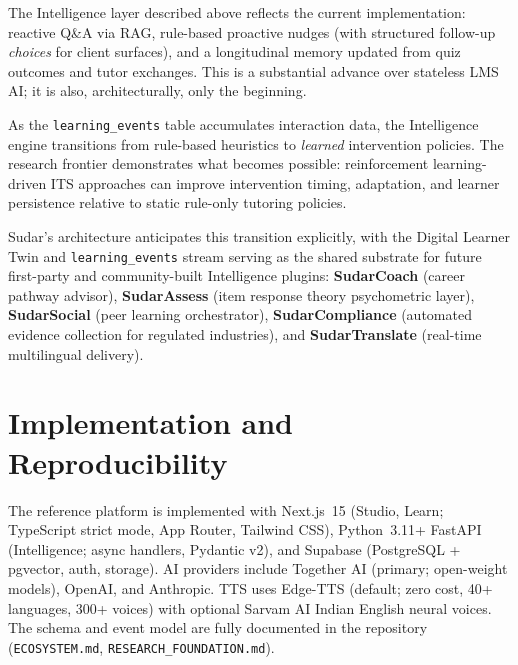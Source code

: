 \documentclass[10pt,twocolumn]{article}
\begin{document}
The Intelligence layer described above reflects the current
implementation: reactive Q\&A via RAG, rule-based proactive nudges (with
structured follow-up \emph{choices} for client surfaces),
and a longitudinal memory updated from quiz outcomes and tutor
exchanges. This is a substantial advance over stateless LMS AI; it is
also, architecturally, only the beginning.

As the \texttt{learning\_events} table accumulates interaction data,
the Intelligence engine transitions from rule-based heuristics to
\emph{learned} intervention policies. The research frontier demonstrates
what becomes possible: reinforcement learning-driven ITS approaches can
improve intervention timing, adaptation, and learner persistence
relative to static rule-only tutoring policies.

Sudar's architecture anticipates this transition explicitly, with the
Digital Learner Twin and \texttt{learning\_events} stream serving as
the shared substrate for future first-party and community-built
Intelligence plugins: \textbf{SudarCoach} (career pathway advisor),
\textbf{SudarAssess} (item response theory psychometric layer),
\textbf{SudarSocial} (peer learning orchestrator),
\textbf{SudarCompliance} (automated evidence collection for regulated
industries), and \textbf{SudarTranslate} (real-time multilingual
delivery).

\section{Implementation and Reproducibility}
\label{sec:impl}

The reference platform is implemented with Next.js~15 (Studio, Learn;
TypeScript strict mode, App Router, Tailwind CSS),
Python~3.11+ FastAPI (Intelligence; async handlers, Pydantic v2), and
Supabase (PostgreSQL + pgvector, auth, storage). AI providers include
Together AI (primary; open-weight models), OpenAI, and Anthropic.
TTS uses Edge-TTS (default; zero cost, 40+ languages, 300+ voices)
with optional Sarvam AI Indian English neural voices. The schema and
event model are fully documented in the repository
(\texttt{ECOSYSTEM.md}, \texttt{RESEARCH\_FOUNDATION.md}).
\end{document}

